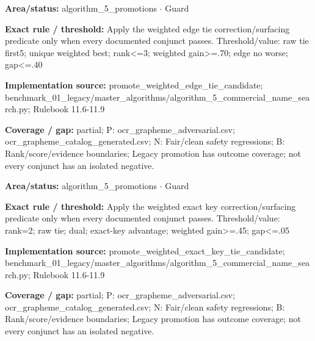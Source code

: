 \begin{tcolorbox}[enhanced,breakable,colback=white,colframe=Muted!45,boxrule=0.45pt,arc=1.5pt,left=6pt,right=6pt,top=5pt,bottom=5pt,title={\texttt{A5-PROMOTE-WEIGHTED-EDGE-TIE}},title after break={\texttt{A5-PROMOTE-WEIGHTED-EDGE-TIE}\ (continued)},fonttitle=\headingfont\bfseries\color{Navy},coltitle=Navy]
\textbf{Area/status:} algorithm\_\allowbreak{}5\_\allowbreak{}promotions $\boldsymbol{\cdot}$ Guard\par
\smallskip
\textbf{Exact rule / threshold:} Apply the weighted edge tie correction/\allowbreak{}surfacing predicate only when every documented conjunct passes. Threshold/\allowbreak{}value: raw tie first5; unique weighted best; rank<=3; weighted gain>=.70; edge no worse; gap<=.40\par
\smallskip
\textbf{Implementation source:} promote\_\allowbreak{}weighted\_\allowbreak{}edge\_\allowbreak{}tie\_\allowbreak{}candidate; benchmark\_\allowbreak{}01\_\allowbreak{}legacy/\allowbreak{}master\_\allowbreak{}algorithms/\allowbreak{}algorithm\_\allowbreak{}5\_\allowbreak{}commercial\_\allowbreak{}name\_\allowbreak{}search.py; Rulebook 11.6-11.9\par
\smallskip
\textbf{Coverage / gap:} partial; P: ocr\_\allowbreak{}grapheme\_\allowbreak{}adversarial.csv; ocr\_\allowbreak{}grapheme\_\allowbreak{}catalog\_\allowbreak{}generated.csv; N: Fair/\allowbreak{}clean safety regressions; B: Rank/\allowbreak{}score/\allowbreak{}evidence boundaries; Legacy promotion has outcome coverage; not every conjunct has an isolated negative.
\end{tcolorbox}
\begin{tcolorbox}[enhanced,breakable,colback=white,colframe=Muted!45,boxrule=0.45pt,arc=1.5pt,left=6pt,right=6pt,top=5pt,bottom=5pt,title={\texttt{A5-PROMOTE-WEIGHTED-EXACT-KEY}},title after break={\texttt{A5-PROMOTE-WEIGHTED-EXACT-KEY}\ (continued)},fonttitle=\headingfont\bfseries\color{Navy},coltitle=Navy]
\textbf{Area/status:} algorithm\_\allowbreak{}5\_\allowbreak{}promotions $\boldsymbol{\cdot}$ Guard\par
\smallskip
\textbf{Exact rule / threshold:} Apply the weighted exact key correction/\allowbreak{}surfacing predicate only when every documented conjunct passes. Threshold/\allowbreak{}value: rank=2; raw tie; dual; exact-key advantage; weighted gain>=.45; gap<=.05\par
\smallskip
\textbf{Implementation source:} promote\_\allowbreak{}weighted\_\allowbreak{}exact\_\allowbreak{}key\_\allowbreak{}tie\_\allowbreak{}candidate; benchmark\_\allowbreak{}01\_\allowbreak{}legacy/\allowbreak{}master\_\allowbreak{}algorithms/\allowbreak{}algorithm\_\allowbreak{}5\_\allowbreak{}commercial\_\allowbreak{}name\_\allowbreak{}search.py; Rulebook 11.6-11.9\par
\smallskip
\textbf{Coverage / gap:} partial; P: ocr\_\allowbreak{}grapheme\_\allowbreak{}adversarial.csv; ocr\_\allowbreak{}grapheme\_\allowbreak{}catalog\_\allowbreak{}generated.csv; N: Fair/\allowbreak{}clean safety regressions; B: Rank/\allowbreak{}score/\allowbreak{}evidence boundaries; Legacy promotion has outcome coverage; not every conjunct has an isolated negative.
\end{tcolorbox}
\medskip
